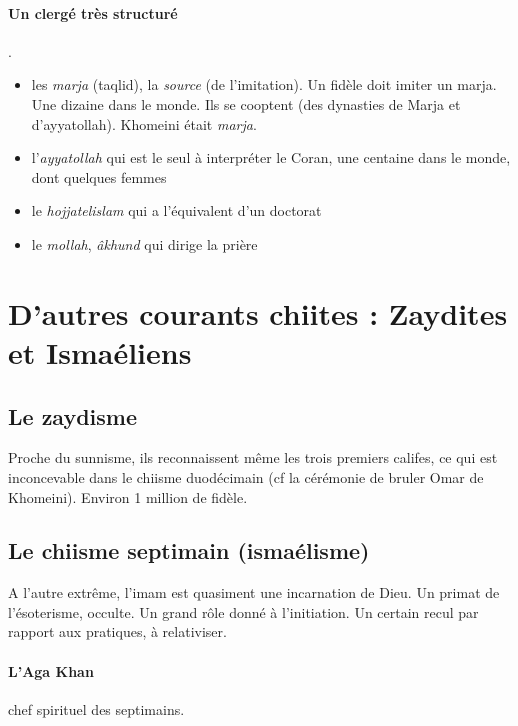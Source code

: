  \paragraph{Un clergé très structuré}. 
 \begin{itemize}
     \item les \emph{marja} (taqlid), la \emph{source} (de l'imitation). Un fidèle doit imiter un marja. Une dizaine dans le monde. Ils se cooptent (des dynasties de Marja et d'ayyatollah). Khomeini était \textit{marja}.
     \item l'\emph{ayyatollah} qui est le seul à interpréter le Coran, une centaine dans le monde, dont quelques femmes
     \item le \emph{hojjatelislam} qui a l'équivalent d'un doctorat
     \item le \emph{mollah}, \emph{âkhund} qui dirige la prière
 \end{itemize}
 
 
 
  \section{D'autres courants chiites :
  Zaydites et
  Ismaéliens} 
 
   \subsection{Le zaydisme}
   
   Proche du sunnisme, ils reconnaissent même les trois premiers califes, ce qui est inconcevable dans le chiisme duodécimain (cf la cérémonie de bruler Omar de Khomeini).
   Environ 1 million de fidèle.
   
   \subsection{Le chiisme septimain (ismaélisme)}
   A l'autre extrême, l'imam est quasiment une incarnation de Dieu. Un primat de l'ésoterisme, occulte. Un grand rôle donné à l'initiation. Un certain recul par rapport aux pratiques, à relativiser. 

\paragraph{L'Aga Khan} chef spirituel des septimains.
 



